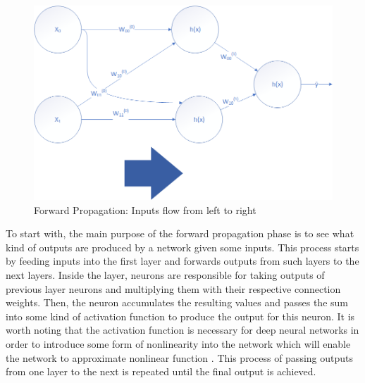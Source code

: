 \documentclass{IEEEtran}
\begin{document}
        \begin{figure}[!htb]
            \centering
            \captionsetup{justification=centering}
            \includegraphics[width=\linewidth]{ForwardProp.png}
            \caption{Forward Propagation: Inputs flow from left to right}  
        \end{figure}

        To start with, the main purpose of the forward propagation phase is to see what kind of outputs are produced by a network given some inputs. This process starts by feeding inputs into the first layer and forwards outputs from such layers to the next layers. Inside the layer, neurons are responsible for taking outputs of previous layer neurons and multiplying them with their respective connection weights. Then, the neuron accumulates the resulting values and passes the sum into some kind of activation function to produce the output for this neuron. It is worth noting that the activation function is necessary for deep neural networks in order to introduce some form of nonlinearity into the network which will enable the network to approximate nonlinear function \cite{luhaniwal_2020}. This process of passing outputs from one layer to the next is repeated until the final output is achieved.
\end{document}
